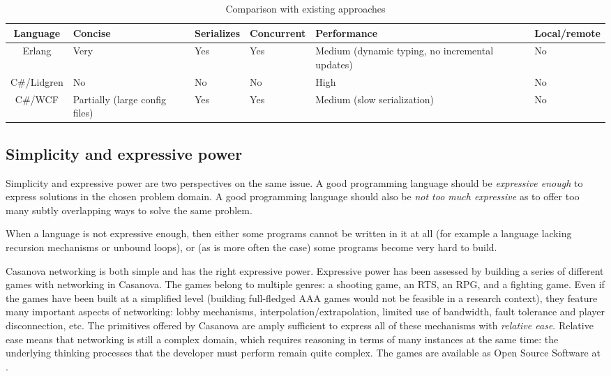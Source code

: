 \begin{table}
\center
\begin{tabular}{ c p{2cm} p{2cm} p{2cm} p{4cm} p{2cm}  }
\hline
Language & Concise & Serializes & Concurrent & Performance & Local/remote \\
\hline
Erlang   & Very    & Yes        & Yes        & Medium (dynamic typing, no incremental updates) & No \\
C\#/Lidgren & No   & No         & No         & High        & No \\
C\#/WCF  & Partially (large config files) & Yes & Yes & Medium (slow serialization) & No \\
\hline
\end{tabular}
\label{tab:comparison with existing approaches}
\caption{Comparison with existing approaches}
\end{table}


\subsection{Simplicity and expressive power}
Simplicity and expressive power are two perspectives on the same issue. A good programming language should be \textit{expressive enough} to express solutions in the chosen problem domain. A good programming language should also be \textit{not too much expressive} as to offer too many subtly overlapping ways to solve the same problem.

When a language is not expressive enough, then either some programs cannot be written in it at all (for example a language lacking recursion mechanisms or unbound loops), or (as is more often the case) some programs become very hard to build.

Casanova networking is both simple and has the right expressive power. Expressive power has been assessed by building a series of different games with networking in Casanova. The games belong to multiple genres: a shooting game, an RTS, an RPG, and a fighting game. Even if the games have been built at a simplified level (building full-fledged AAA games would not be feasible in a research context), they feature many important aspects of networking: lobby mechanisms, interpolation/extrapolation, limited use of bandwidth, fault tolerance and player disconnection, etc. The primitives offered by Casanova are amply sufficient to express all of these mechanisms with \textit{relative ease}. Relative ease means that networking is still a complex domain, which requires reasoning in terms of many instances at the same time: the underlying thinking processes that the developer must perform remain quite complex. The games are available as Open Source Software at \cite{CNV_MULTIPLAYER_SAMPLES}.

